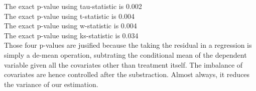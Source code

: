 \documentclass[]{article}
\newenvironment{Shaded}{\begin{snugshade}}{\end{snugshade}}
\newcommand{\KeywordTok}[1]{\textcolor[rgb]{0.13,0.29,0.53}{\textbf{#1}}}
\newcommand{\DataTypeTok}[1]{\textcolor[rgb]{0.13,0.29,0.53}{#1}}
\newcommand{\DecValTok}[1]{\textcolor[rgb]{0.00,0.00,0.81}{#1}}
\newcommand{\StringTok}[1]{\textcolor[rgb]{0.31,0.60,0.02}{#1}}
\newcommand{\OtherTok}[1]{\textcolor[rgb]{0.56,0.35,0.01}{#1}}
\newcommand{\ControlFlowTok}[1]{\textcolor[rgb]{0.13,0.29,0.53}{\textbf{#1}}}
\newcommand{\OperatorTok}[1]{\textcolor[rgb]{0.81,0.36,0.00}{\textbf{#1}}}
\newcommand{\NormalTok}[1]{#1}
\begin{document}
\begin{Shaded}
\end{Shaded}

The exact p-value using tau-statistic is 0.002\\
The exact p-value using t-statistic is 0.004\\
The exact p-value using w-statistic is 0.004\\
The exact p-value using ks-statistic is 0.034\\
Those four p-values are jusified because the taking the residual in a
regression is simply a de-mean operation, subtrating the conditional
mean of the dependent variable given all the covariates other than
treatment itself. The imbalance of covariates are hence controlled after
the substraction. Almost always, it reduces the variance of our
estimation.
\end{document}
